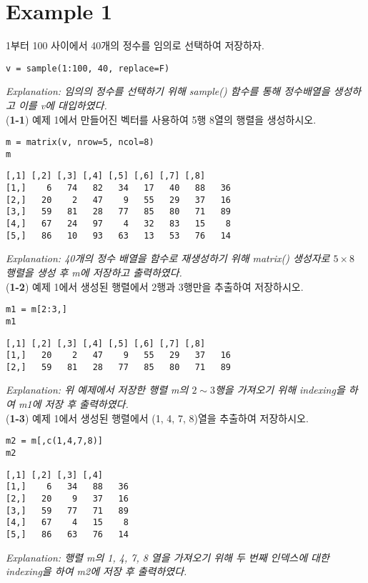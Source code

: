 \documentclass{article}
\begin{document}
\pagestyle{fancy}

\section*{Example 1}
1부터 100 사이에서 40개의 정수를 임의로 선택하여 저장하자. 
\begin{lstlisting}[style={r-style}]
v = sample(1:100, 40, replace=F)
\end{lstlisting}
\emph{Explanation: 임의의 정수를 선택하기 위해 sample() 함수를 통해 정수배열을 생성하고 이를 v에 대입하였다.} \\

(\textbf{1-1}) 예제 1에서 만들어진 벡터를 사용하여 5행 8열의 행렬을 생성하시오.
\begin{lstlisting}[style={r-style}]
m = matrix(v, nrow=5, ncol=8)
m
\end{lstlisting}
\begin{lstlisting}[style={out-style}]
     [,1] [,2] [,3] [,4] [,5] [,6] [,7] [,8]
[1,]    6   74   82   34   17   40   88   36
[2,]   20    2   47    9   55   29   37   16
[3,]   59   81   28   77   85   80   71   89
[4,]   67   24   97    4   32   83   15    8
[5,]   86   10   93   63   13   53   76   14
\end{lstlisting}
\emph{Explanation: 40개의 정수 배열을 함수로 재생성하기 위해 matrix() 생성자로 $5\times8$ 행렬을 생성 후 m에 저장하고 출력하였다.} \\

(\textbf{1-2}) 
예제 1에서 생성된 행렬에서 2행과 3행만을 추출하여 저장하시오.
\begin{lstlisting}[style={r-style}]
m1 = m[2:3,]
m1
\end{lstlisting}
\begin{lstlisting}[style={out-style}]
     [,1] [,2] [,3] [,4] [,5] [,6] [,7] [,8]
[1,]   20    2   47    9   55   29   37   16
[2,]   59   81   28   77   85   80   71   89
\end{lstlisting}
\emph{Explanation: 위 예제에서 저장한 행렬 m의 $2 \sim 3$행을 가져오기 위해 indexing을 하여 m1에 저장 후 출력하였다.} \\

(\textbf{1-3}) 예제 1에서 생성된 행렬에서 (1, 4, 7, 8)열을 추출하여 저장하시오.
\begin{lstlisting}[style={r-style}]
m2 = m[,c(1,4,7,8)]
m2
\end{lstlisting}
\begin{lstlisting}[style={out-style}]
     [,1] [,2] [,3] [,4]
[1,]    6   34   88   36
[2,]   20    9   37   16
[3,]   59   77   71   89
[4,]   67    4   15    8
[5,]   86   63   76   14
\end{lstlisting}
\emph{Explanation: 행렬 m의 1, 4, 7, 8 열을 가져오기 위해 두 번째 인덱스에 대한 indexing을 하여 m2에 저장 후 출력하였다.} \\
\end{document}

